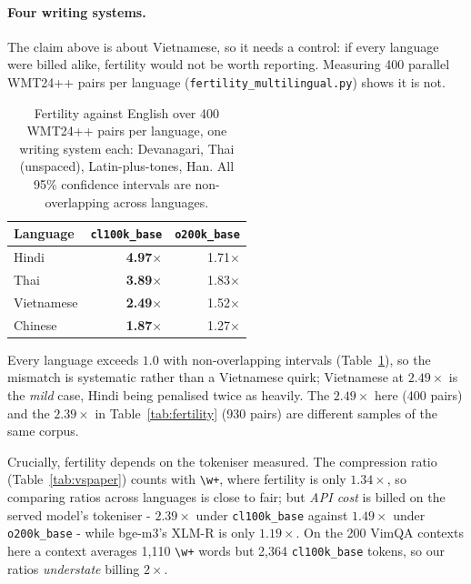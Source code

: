\documentclass[11pt]{article}
\begin{document}
\paragraph{Four writing systems.}
\label{app:multiling}
The claim above is about Vietnamese, so it needs a control: if every language were
billed alike, fertility would not be worth reporting. Measuring 400 parallel
WMT24++ pairs per language (\texttt{fertility\_multilingual.py}) shows it is not.

\begin{table}[htbp]
\centering
\small
\begin{tabular}{lrr}
\toprule
Language & \texttt{cl100k\_base} & \texttt{o200k\_base} \\
\midrule
Hindi & \textbf{4.97}$\times$ & 1.71$\times$ \\
Thai & \textbf{3.89}$\times$ & 1.83$\times$ \\
Vietnamese & \textbf{2.49}$\times$ & 1.52$\times$ \\
Chinese & \textbf{1.87}$\times$ & 1.27$\times$ \\
\bottomrule
\end{tabular}
\caption{Fertility against English over 400 WMT24++ pairs per language, one
writing system each: Devanagari, Thai (unspaced), Latin-plus-tones, Han. All
95\% confidence intervals are non-overlapping across languages.}
\label{tab:multiling}
\end{table}

Every language exceeds $1.0$ with non-overlapping intervals (Table~\ref{tab:multiling}), so the mismatch is systematic rather than a Vietnamese quirk; Vietnamese at $2.49\times$ is the \emph{mild} case, Hindi being penalised twice as heavily. The $2.49\times$ here (400 pairs) and the $2.39\times$ in Table~\ref{tab:fertility} (930 pairs) are different samples of the same corpus.



Crucially, fertility depends on the tokeniser measured. The compression ratio (Table~\ref{tab:vspaper}) counts with \texttt{\textbackslash w+}, where fertility is only $1.34\times$, so comparing ratios across languages is close to fair; but \emph{API cost} is billed on the served model's tokeniser - $2.39\times$ under \texttt{cl100k\_base} against $1.49\times$ under \texttt{o200k\_base} - while bge-m3's XLM-R is only $1.19\times$. On the 200 VimQA contexts here a context averages 1{,}110 \texttt{\textbackslash w+} words but 2{,}364 \texttt{cl100k\_base} tokens, so our ratios \emph{understate} billing $2\times$.
\end{document}
